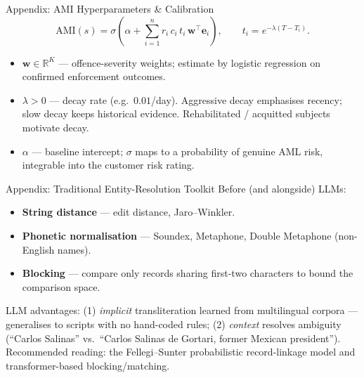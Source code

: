 \documentclass[9pt,t]{beamer}
\begin{document}
\begin{frame}[noframenumbering]{Appendix: AMI Hyperparameters \& Calibration}
\[
\mathrm{AMI}(s) = \sigma\!\left(\alpha + \sum_{i=1}^{n} r_i\, c_i\, t_i\,
\mathbf{w}^{\top}\mathbf{e}_i\right), \qquad t_i = e^{-\lambda(T - T_i)}.
\]
\begin{itemize}
  \item $\mathbf{w} \in \mathbb{R}^K$ --- offence-severity weights; estimate by
        logistic regression on confirmed enforcement outcomes.
  \item $\lambda > 0$ --- decay rate (e.g.\ $0.01$/day). Aggressive decay
        emphasises recency; slow decay keeps historical evidence. Rehabilitated /
        acquitted subjects motivate decay.
  \item $\alpha$ --- baseline intercept; $\sigma$ maps to a probability of genuine
        AML risk, integrable into the customer risk rating.
\end{itemize}
\end{frame}

\begin{frame}[noframenumbering]{Appendix: Traditional Entity-Resolution Toolkit}
Before (and alongside) LLMs:
\begin{itemize}
  \item \textbf{String distance} --- edit distance, Jaro--Winkler.
  \item \textbf{Phonetic normalisation} --- Soundex, Metaphone, Double Metaphone
        (non-English names).
  \item \textbf{Blocking} --- compare only records sharing first-two characters to
        bound the comparison space.
\end{itemize}

\medskip
LLM advantages: (1) \emph{implicit} transliteration learned from multilingual
corpora --- generalises to scripts with no hand-coded rules; (2) \emph{context}
resolves ambiguity (``Carlos Salinas'' vs.\ ``Carlos Salinas de Gortari, former
Mexican president''). Recommended reading: the Fellegi--Sunter probabilistic
record-linkage model and transformer-based blocking/matching.
\end{frame}
\end{document}

